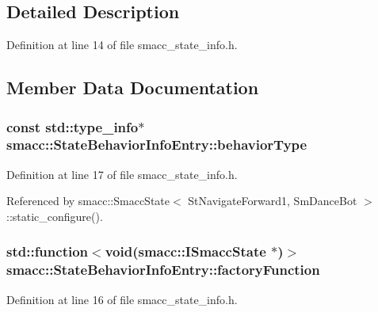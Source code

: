\subsection{Detailed Description}


Definition at line 14 of file smacc\+\_\+state\+\_\+info.\+h.



\subsection{Member Data Documentation}
\subsubsection[{\texorpdfstring{behavior\+Type}{behaviorType}}]{\setlength{\rightskip}{0pt plus 5cm}const std\+::type\+\_\+info$\ast$ smacc\+::\+State\+Behavior\+Info\+Entry\+::behavior\+Type}\hypertarget{structsmacc_1_1StateBehaviorInfoEntry_a9f77a396b80171e010b3c30778b2f3f0}{}\label{structsmacc_1_1StateBehaviorInfoEntry_a9f77a396b80171e010b3c30778b2f3f0}


Definition at line 17 of file smacc\+\_\+state\+\_\+info.\+h.



Referenced by smacc\+::\+Smacc\+State$<$ St\+Navigate\+Forward1, Sm\+Dance\+Bot $>$\+::static\+\_\+configure().

\subsubsection[{\texorpdfstring{factory\+Function}{factoryFunction}}]{\setlength{\rightskip}{0pt plus 5cm}std\+::function$<$void({\bf smacc\+::\+I\+Smacc\+State} $\ast$)$>$ smacc\+::\+State\+Behavior\+Info\+Entry\+::factory\+Function}\hypertarget{structsmacc_1_1StateBehaviorInfoEntry_a0af2d6aabb921c95fd723b554cc21aa9}{}\label{structsmacc_1_1StateBehaviorInfoEntry_a0af2d6aabb921c95fd723b554cc21aa9}


Definition at line 16 of file smacc\+\_\+state\+\_\+info.\+h.



